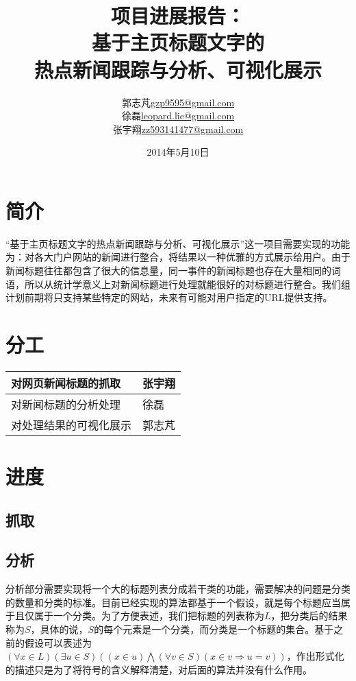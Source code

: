 \documentclass[12pt]{article}
\begin{document}
\title{项目进展报告：\\[3ex] 基于主页标题文字的\\热点新闻跟踪与分析、可视化展示\\[3ex]}

\author{郭志芃\quad\href{mailto:gzp9595@gmail.com}{gzp9595@gmail.com}\\
	徐磊\quad\href{mailto:leopard.lie@gmail.com}{leopard.lie@gmail.com}\\
	张宇翔\quad\href{mailto:zz593141477@gmail.com}{zz593141477@gmail.com}\\[3ex]}
\date{2014年5月10日}
\maketitle
\newpage
\renewcommand{\contentsname}{项目进展报告}
\tableofcontents
\newpage
\section{简介}
“基于主页标题文字的热点新闻跟踪与分析、可视化展示”这一项目需要实现的功能为：对各大门户网站的新闻进行整合，将结果以一种优雅的方式展示给用户。由于新闻标题往往都包含了很大的信息量，同一事件的新闻标题也存在大量相同的词语，所以从统计学意义上对新闻标题进行处理就能很好的对标题进行整合。我们组计划前期将只支持某些特定的网站，未来有可能对用户指定的URL提供支持。
\section{分工}
\begin{center}
\begin{table}[!hbp]
\begin{tabular}{||l|l||}
\hline\hline
对网页新闻标题的抓取 & 张宇翔\\
\hline
对新闻标题的分析处理 & 徐磊\\
\hline
对处理结果的可视化展示 & 郭志芃\\
\hline\hline
\end{tabular}
\end{table}
\end{center}
\section{进度}
\subsection{抓取}
\subsection{分析}
分析部分需要实现将一个大的标题列表分成若干类的功能，需要解决的问题是分类的数量和分类的标准。目前已经实现的算法都基于一个假设，就是每个标题应当属于且仅属于一个分类。为了方便表述，我们把标题的列表称为$L$，把分类后的结果称为$S$，具体的说，$S$的每个元素是一个分类，而分类是一个标题的集合。基于之前的假设可以表述为$(\forall x \in L)(\exists u \in S)((x \in u )\bigwedge(\forall v \in S) (x \in v \Rightarrow u = v))$，作出形式化的描述只是为了将符号的含义解释清楚，对后面的算法并没有什么作用。
\end{document}
